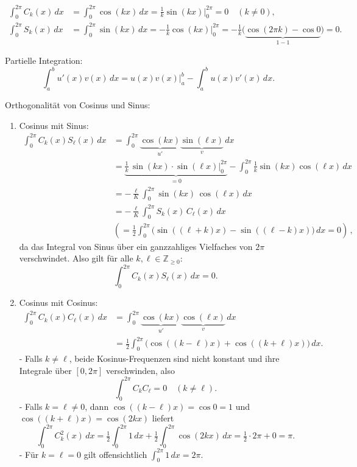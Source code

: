 \begin{beweisbox}
    \begin{align*}
        \int_{0}^{2\pi} C_k(x)\,dx &= \int_{0}^{2\pi} \cos(kx)\,dx
        = \frac{1}{k}\sin(kx)\Big|_{0}^{2\pi}=0 \quad (k\neq 0),\\[10pt]
        \int_{0}^{2\pi} S_k(x)\,dx &= \int_{0}^{2\pi} \sin(kx)\,dx
        = -\frac{1}{k}\cos(kx)\Big|_{0}^{2\pi}
        = -\frac{1}{k}\big(\underbrace{\cos(2\pi k)-\cos 0}_{1-1}\big)=0.
    \end{align*}

    Partielle Integration:
    $$
        \int_a^b u'(x)v(x)\,dx = u(x)v(x)\Big|_a^b - \int_a^b u(x)v'(x)\,dx.
    $$

    Orthogonalität von Cosinus und Sinus:
    \begin{enumerate}
        \item Cosinus mit Sinus:
            \begin{align*}
                \int_{0}^{2\pi} C_k(x)S_\ell(x)\,dx
                &= \int_{0}^{2\pi} \underbrace{\cos(kx)}_{u\prime} \underbrace{\sin(\ell x)}_{v}\,dx\\
                &= \underbrace{\frac{1}{k} \, \sin(kx) \cdot \sin(\ell x) \Big|_{0}^{2\pi}}_{=0} - \int_{0}^{2\pi} \frac{1}{k} \sin(kx) \cos(\ell x) \, dx \\
                &= -\frac{\ell}{K} \int_0^{2\pi} \sin(kx) \, \cos(\ell x) \, dx \\
                &= -\frac{\ell}{K} \int_0^{2\pi} S_k(x) \, C_\ell(x) \, dx \\
                &\left(= \tfrac{1}{2}\int_{0}^{2\pi}\big(\sin((\ell+k)x)-\sin((\ell-k)x)\big)\,dx = 0\right) \, ,
            \end{align*}
            da das Integral von Sinus über ein ganzzahliges Vielfaches von $2\pi$ verschwindet.
            Also gilt für alle $k,\ell\in\mathbb{Z}_{\ge0}$:
            $$
            \int_{0}^{2\pi} C_k(x)S_\ell(x)\,dx = 0.
            $$

        \item Cosinus mit Cosinus:
            \begin{align*}
                \int_{0}^{2\pi} C_k(x)C_\ell(x)\,dx
                &= \int_{0}^{2\pi} \underbrace{\cos(kx)}_{u\prime} \underbrace{\cos(\ell x)}_{v}\,dx\\
                &= \tfrac{1}{2}\int_{0}^{2\pi}\big(\cos((k-\ell)x)+\cos((k+\ell)x)\big)\,dx.
            \end{align*}
            - Falls $k\neq\ell$, beide Kosinus-Frequenzen sind nicht konstant und ihre Integrale über $[0,2\pi]$ verschwinden, also
            $$
            \int_{0}^{2\pi} C_k C_\ell = 0 \quad (k\neq\ell).
            $$
            - Falls $k=\ell\neq0$, dann $\cos((k-\ell)x)=\cos 0=1$ und $\cos((k+\ell)x)=\cos(2kx)$ liefert
            $$
            \int_{0}^{2\pi} C_k^2(x)\,dx = \tfrac{1}{2}\int_{0}^{2\pi}1\,dx + \tfrac{1}{2}\int_{0}^{2\pi}\cos(2kx)\,dx
            = \tfrac{1}{2}\cdot 2\pi + 0 = \pi.
            $$
            - Für $k=\ell=0$ gilt offensichtlich $\int_{0}^{2\pi}1\,dx=2\pi$.


\end{enumerate}
\end{beweisbox}
